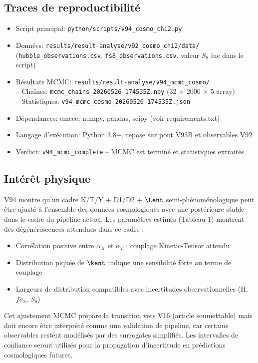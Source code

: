 \subsection*{Traces de reproductibilité}

\begin{itemize}
\item Script principal: \texttt{python/scripts/v94\_cosmo\_chi2.py}
\item Données: \texttt{results/result-analyse/v92\_cosmo\_chi2/data/} (\texttt{hubble\_observations.csv}, \texttt{fs8\_observations.csv}, valeur $S_8$ lue dans le script)
\item Résultats MCMC: \texttt{results/result-analyse/v94\_mcmc\_cosmo/} \\
  -- Chaînes: \texttt{mcmc\_chains\_20260526-174535Z.npy} (32 × 2000 × 5 array) \\
  -- Statistiques: \texttt{v94\_mcmc\_cosmo\_20260526-174535Z.json}
\item Dépendances: emcee, numpy, pandas, scipy (voir requirements.txt)
\item Langage d'exécution: Python 3.8+, repose sur pont V93B et observables V92
\item Verdict: \texttt{v94\_mcmc\_complete} -- MCMC est terminé et statistiques extraites
\end{itemize}

\subsection*{Intérêt physique}

V94 montre qu'un cadre K/T/Y + D1/D2 + $\Lent$ semi-phénoménologique peut être ajusté à
l'ensemble des données cosmologiques avec une postérieure stable dans le cadre du pipeline actuel. Les paramètres estimés
(Tableau 1) montrent des dégénérescences attendues dans ce cadre :
\begin{itemize}
\item Corrélation positive entre $\alpha_K$ et $\alpha_T$ : couplage Kinetic-Tensor attendu
\item Distribution piquée de $\kent$ indique une sensibilité forte au terme de couplage
\item Largeurs de distribution compatibles avec incertitudes observationnelles (H, $f\sigma_8$, $S_8$)
\end{itemize}

Cet ajustement MCMC prépare la transition vers V16 (article soumettable) mais doit encore être interprété comme une validation de pipeline, car certains observables restent modélisés par des surrogates simplifiés. Les intervalles de confiance seront utilisés pour la propagation d'incertitude en prédictions cosmologiques futures.

